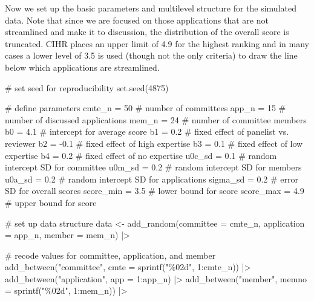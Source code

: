 \documentclass[
  letterpaper,
  DIV=11,
  numbers=noendperiod]{scrartcl}
\newenvironment{Shaded}{\begin{snugshade}}{\end{snugshade}}
\newcommand{\AttributeTok}[1]{\textcolor[rgb]{0.40,0.45,0.13}{#1}}
\newcommand{\CommentTok}[1]{\textcolor[rgb]{0.37,0.37,0.37}{#1}}
\newcommand{\DecValTok}[1]{\textcolor[rgb]{0.68,0.00,0.00}{#1}}
\newcommand{\FloatTok}[1]{\textcolor[rgb]{0.68,0.00,0.00}{#1}}
\newcommand{\FunctionTok}[1]{\textcolor[rgb]{0.28,0.35,0.67}{#1}}
\newcommand{\NormalTok}[1]{\textcolor[rgb]{0.00,0.23,0.31}{#1}}
\newcommand{\OtherTok}[1]{\textcolor[rgb]{0.00,0.23,0.31}{#1}}
\newcommand{\SpecialCharTok}[1]{\textcolor[rgb]{0.37,0.37,0.37}{#1}}
\newcommand{\StringTok}[1]{\textcolor[rgb]{0.13,0.47,0.30}{#1}}
\begin{document}
Now we set up the basic parameters and multilevel structure for the
simulated data. Note that since we are focused on those applications
that are not streamlined and make it to discussion, the distribution of
the overall score is truncated. CIHR places an upper limit of 4.9 for
the highest ranking and in many cases a lower level of 3.5 is used
(though not the only criteria) to draw the line below which applications
are streamlined.

\begin{Shaded}
\begin{Highlighting}[]
\CommentTok{\# set seed for reproducibility}
\FunctionTok{set.seed}\NormalTok{(}\DecValTok{4875}\NormalTok{)}

\CommentTok{\# define parameters}
\NormalTok{cmte\_n }\OtherTok{=} \DecValTok{50}      \CommentTok{\# number of committees}
\NormalTok{app\_n }\OtherTok{=} \DecValTok{15}       \CommentTok{\# number of discussed applications}
\NormalTok{mem\_n }\OtherTok{=} \DecValTok{24}       \CommentTok{\# number of committee members}
\NormalTok{b0 }\OtherTok{=} \FloatTok{4.1}         \CommentTok{\# intercept for average score}
\NormalTok{b1 }\OtherTok{=} \FloatTok{0.2}         \CommentTok{\# fixed effect of panelist vs. reviewer }
\NormalTok{b2 }\OtherTok{=} \SpecialCharTok{{-}}\FloatTok{0.1}        \CommentTok{\# fixed effect of high expertise}
\NormalTok{b3 }\OtherTok{=} \FloatTok{0.1}         \CommentTok{\# fixed effect of low expertise}
\NormalTok{b4 }\OtherTok{=} \FloatTok{0.2}         \CommentTok{\# fixed effect of no expertise}
\NormalTok{u0c\_sd }\OtherTok{=} \FloatTok{0.1}     \CommentTok{\# random intercept SD for committee}
\NormalTok{u0m\_sd }\OtherTok{=} \FloatTok{0.2}     \CommentTok{\# random intercept SD for members}
\NormalTok{u0a\_sd }\OtherTok{=} \FloatTok{0.2}     \CommentTok{\# random intercept SD for applications}
\NormalTok{sigma\_sd }\OtherTok{=} \FloatTok{0.2}   \CommentTok{\# error SD for overall scores}
\NormalTok{score\_min }\OtherTok{=} \FloatTok{3.5}  \CommentTok{\# lower bound for score}
\NormalTok{score\_max }\OtherTok{=} \FloatTok{4.9}  \CommentTok{\# upper bound for score}

\CommentTok{\# set up data structure}
\NormalTok{data }\OtherTok{\textless{}{-}} \FunctionTok{add\_random}\NormalTok{(}\AttributeTok{committee =}\NormalTok{ cmte\_n, }
  \AttributeTok{application =}\NormalTok{ app\_n, }\AttributeTok{member =}\NormalTok{ mem\_n) }\SpecialCharTok{|\textgreater{}}
  
  \CommentTok{\# recode values for committee, application, and member}
  \FunctionTok{add\_between}\NormalTok{(}\StringTok{"committee"}\NormalTok{, }
    \AttributeTok{cmte =} \FunctionTok{sprintf}\NormalTok{(}\StringTok{"\%02d"}\NormalTok{, }\DecValTok{1}\SpecialCharTok{:}\NormalTok{cmte\_n)) }\SpecialCharTok{|\textgreater{}}
  \FunctionTok{add\_between}\NormalTok{(}\StringTok{"application"}\NormalTok{,}
    \AttributeTok{app =} \DecValTok{1}\SpecialCharTok{:}\NormalTok{app\_n) }\SpecialCharTok{|\textgreater{}}
  \FunctionTok{add\_between}\NormalTok{(}\StringTok{"member"}\NormalTok{, }
    \AttributeTok{memno =} \FunctionTok{sprintf}\NormalTok{(}\StringTok{"\%02d"}\NormalTok{, }\DecValTok{1}\SpecialCharTok{:}\NormalTok{mem\_n)) }\SpecialCharTok{|\textgreater{}}
  

\end{Highlighting}
\end{Shaded}
\end{document}
